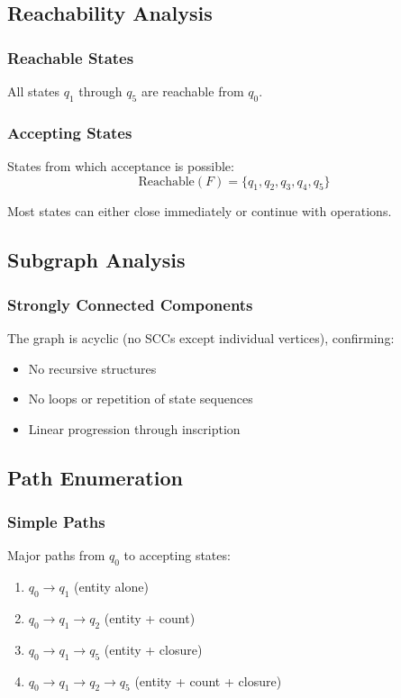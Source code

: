 \subsection{Reachability Analysis}

\subsubsection{Reachable States}
All states $q_1$ through $q_5$ are reachable from $q_0$.

\subsubsection{Accepting States}
States from which acceptance is possible:
\[
\text{Reachable}(F) = \{q_1, q_2, q_3, q_4, q_5\}
\]

Most states can either close immediately or continue with operations.

\subsection{Subgraph Analysis}

\subsubsection{Strongly Connected Components}
The graph is acyclic (no SCCs except individual vertices), confirming:
\begin{itemize}
    \item No recursive structures
    \item No loops or repetition of state sequences
    \item Linear progression through inscription
\end{itemize}

\subsection{Path Enumeration}

\subsubsection{Simple Paths}
Major paths from $q_0$ to accepting states:
\begin{enumerate}
    \item $q_0 \rightarrow q_1$ (entity alone)
    \item $q_0 \rightarrow q_1 \rightarrow q_2$ (entity + count)
    \item $q_0 \rightarrow q_1 \rightarrow q_5$ (entity + closure)
    \item $q_0 \rightarrow q_1 \rightarrow q_2 \rightarrow q_5$ (entity + count + closure)
\end{enumerate}


